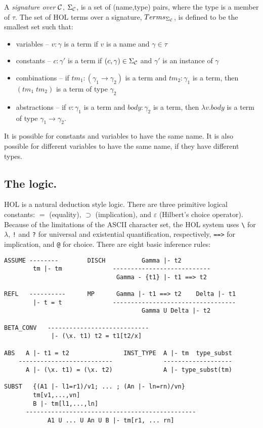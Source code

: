 A {\em signature over ${\cal C}$}, $\Sigma_{\cal C}$, is a set of (name,type)
pairs, where the type is a member of $\tau$. The set of HOL terms over a
signature, $Terms_{\Sigma_{{\cal C}}}$, is defined to be the smallest set such
that:
\begin{itemize}
\item variables -- $v:\gamma$ is a term if $v$ is a name and $\gamma \in \tau$
\item constants -- $c:\gamma'$ is a term if $(c,\gamma) \in \Sigma_{\cal C}$ and 
$\gamma'$ is an instance of $\gamma$
\item combinations -- if $tm_1:(\gamma_1 \rightarrow \gamma_2)$ is a term and
$tm_2:\gamma_1$ is a term, then $(tm_1 \;tm_2)$ is a term of type $\gamma_2$
\item abstractions -- if $v:\gamma_1$ is a term and $body:\gamma_2$ is a term, then $\lambda v.
body$ is a term of type $\gamma_1 \rightarrow \gamma_2$.
\end{itemize}

It is possible for constants and variables to have the same name. It is also
possible for different variables to have the same name, if they have different
types.

\subsection{The logic.}

HOL is a natural deduction style logic. There are three primitive logical
constants: $=$ (equality), $\supset$ (implication), and $\varepsilon$
(Hilbert's choice operator). Because of the limitations of the ASCII character
set, the HOL system uses \verb+\+ for $\lambda$, \verb+!+ and \verb+?+ for universal and
existential quantification, respectively, \verb+==>+ for implication, and \verb+@+
for choice. There are eight basic inference rules:
\begin{verbatim}
ASSUME --------        DISCH          Gamma |- t2
        tm |- tm              ---------------------------
                               Gamma - {t1} |- t1 ==> t2

REFL   ----------      MP      Gamma |- t1 ==> t2    Delta |- t1
        |- t = t              ----------------------------------
                                      Gamma U Delta |- t2

BETA_CONV   ----------------------------
             |- (\x. t1) t2 = t1[t2/x]

ABS   A |- t1 = t2               INST_TYPE  A |- tm  type_subst
    --------------------------              -------------------
      A |- (\x. t1) = (\x. t2)              A |- type_subst(tm)

SUBST   {(A1 |- l1=r1)/v1; ... ; (An |- ln=rn)/vn} 
        tm[v1,...,vn]
        B |- tm[l1,...,ln]
      -----------------------------------------------
            A1 U ... U An U B |- tm[r1, ... rn]
\end{verbatim}

